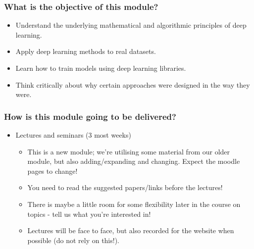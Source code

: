 \documentclass[]{article}
\begin{document}
\begin{frame}
	\frametitle{What is the objective of this module?}
	\begin{itemize}
		\item<+-> Understand the underlying mathematical and algorithmic principles of deep learning.
		\item<+-> Apply deep learning methods to real datasets.
		\item<+-> Learn how to train models using deep learning libraries.
		\item<+-> Think critically about why certain approaches were designed in the way they were.
		
	\end{itemize}
\end{frame}

\begin{frame}
	\frametitle{How is this module going to be delivered?}

	\begin{itemize}
		\item<+-> Lectures and seminars (3 most weeks)
		\begin{itemize}
			\item This is a new module; we're utilising some material from our older module, but also adding/expanding and changing. Expect the moodle pages to change!
			\item You need to read the suggested papers/links before the lectures!
			\item There is maybe a little room for some flexibility later in the course on topics - tell us what you're interested in!
			\item<+-> Lectures will be face to face, but also recorded for the website when possible (do not rely on this!).
		\end{itemize}
	\end{itemize}
\end{frame}
\end{document}
